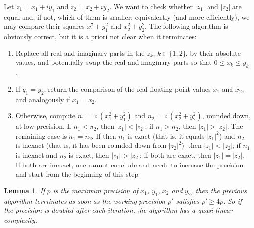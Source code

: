 \documentclass [11pt]{article}
\newcommand {\round}{\operatorname {\circ}}
\renewcommand {\leq}{\leqslant}
\renewcommand {\geq}{\geqslant}
\newtheorem{lemma}[theorem]{Lemma}
\begin{document}
Let $z_1 = x_1 + i y_1$ and $z_2 = x_2 + i y_2$. We want to check whether
$|z_1|$ and $|z_2|$ are equal and, if not, which of them
is smaller; equivalently (and more efficiently), we may compare their squares
$x_1^2 + y_1^2$ and $x_2^2 + y_2^2$.
The following algorithm is obviously correct, but it is a priori not clear
when it terminates:
\begin {enumerate}
\item
Replace all real and imaginary parts in the $z_k$, $k \in \{ 1, 2 \}$, by their
absolute values, and potentially swap the real and imaginary parts so that
$0 \leq x_k \leq y_k$.
\item
If $y_1 = y_2$, return the comparison of the real floating point values
$x_1$ and $x_2$, and analogously if $x_1 = x_2$.
\item
Otherwise, compute $n_1 = \round (x_1^2 + y_1^2)$ and
$n_2 = \round (x_2^2 + y_2^2)$, rounded down, at low precision.
If $n_1 < n_2$, then $|z_1| < |z_2|$;
if $n_1 > n_2$, then $|z_1| > |z_2|$.
The remaining case is $n_1 = n_2$.
If then $n_1$ is exact (that is, it equals $|z_1|^2$) and $n_2$ is inexact
(that is, it has been rounded down from $|z_2|^2$), then $|z_1| < |z_2|$;
if $n_1$ is inexact and $n_2$ is exact, then $|z_1| > |z_2|$;
if both are exact, then $|z_1| = |z_2|$.
If both are inexact, one cannot conclude and needs to increase the precision
and start from the beginning of this step.
\end {enumerate}

\begin {lemma}
If $p$ is the maximum precision of $x_1$, $y_1$, $x_2$ and $y_2$, then the
previous algorithm terminates as soon as the working precision $p'$ satisfies
$p' \geq 4p$.
So if the precision is doubled after each iteration, the algorithm has a
quasi-linear complexity.
\end {lemma}
\end{document}
